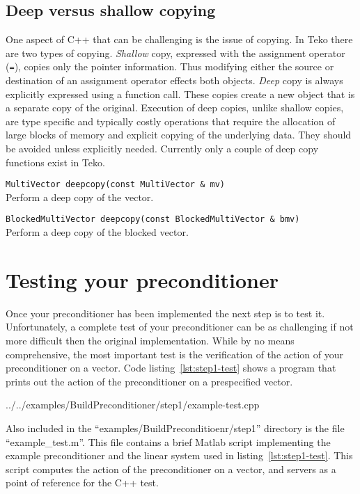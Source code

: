 \documentclass[12pt]{article}
\newcommand{\code}[1]{\lstinline[basicstyle=\footnotesize]!#1!}
\newcommand{\scode}[1]{\lstinline[basicstyle=\small\bfseries]!#1!}
\begin{document}
\subsection{Deep versus shallow copying}
One aspect of C++ that can be challenging is the issue of copying. In Teko there are
two types of copying. \emph{Shallow} copy, expressed with the assignment
operator (\code{=}), copies only the pointer information. Thus modifying either
the source or destination of an assignment operator effects both objects.
\emph{Deep} copy is always explicitly expressed using a function call. 
These copies create a new object that is a separate copy of the original.
Execution of deep copies, unlike shallow copies, are type specific and
typically costly operations that require the allocation of large blocks
of memory and explicit copying of the underlying data. They should be avoided
unless explicitly needed. Currently only a couple of deep copy functions exist
in Teko.
\begin{framed}
\scode{MultiVector deepcopy(const MultiVector & mv)} \\
Perform a deep copy of the vector.

\vspace{10pt}
\scode{BlockedMultiVector deepcopy(const BlockedMultiVector & bmv)} \\
Perform a deep copy of the blocked vector. 
\end{framed}

\section{Testing your preconditioner}\label{sec:testing}
Once your preconditioner has been implemented the next step is to test it.
Unfortunately, a complete test of your preconditioner can be as challenging
if not more difficult then the original implementation. While by no means
comprehensive, the most important test is the verification of the action of your preconditioner
on a vector. Code listing~\ref{lst:step1-test} shows a
program that prints out the action of the preconditioner on a prespecified vector.

\begin{framed}

   {../../examples/BuildPreconditioner/step1/example-test.cpp}
\end{framed}

Also included in the ``examples/BuildPreconditioenr/step1'' directory is the file
``example\_test.m''. This file contains a brief Matlab script implementing the example preconditioner
and the linear system used in listing~\ref{lst:step1-test}. This script computes the action of 
the preconditioner on a vector, and servers as a point of reference for the C++ test.
\end{document}
